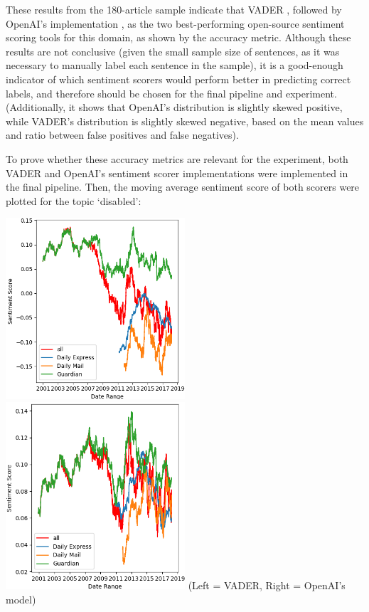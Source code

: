 \documentclass{report}
\begin{document}
These results from the 180-article sample indicate that VADER \cite{VADER}, followed by OpenAI's implementation \cite{OpenAI}, as the two best-performing open-source sentiment scoring tools for this domain, as shown by the accuracy metric.
Although these results are not conclusive (given the small sample size of sentences, as it was necessary to manually label each sentence in the sample), it is a good-enough indicator of which sentiment scorers would perform better in predicting correct labels, and therefore should be chosen for the final pipeline and experiment.
(Additionally, it shows that OpenAI's distribution is slightly skewed positive, while VADER's distribution is slightly skewed negative, based on the mean values and ratio between false positives and false negatives).

To prove whether these accuracy metrics are relevant for the experiment, both VADER and OpenAI's sentiment scorer implementations were implemented in the final pipeline.
Then, the moving average sentiment score of both scorers were plotted for the topic `disabled':

\noindent
\includegraphics[width=0.5\textwidth]{vader.png}
\includegraphics[width=0.5\textwidth]{openai.png}
(Left = VADER, Right = OpenAI's model)
\vspace{0.5em}
\end{document}

